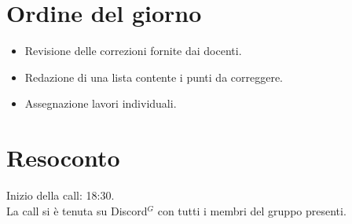 \section{Ordine del giorno}

\begin{itemize}
	\item Revisione delle correzioni fornite dai docenti.
	\item Redazione di una lista contente i punti da correggere.
	\item Assegnazione lavori individuali.
\end{itemize}

\section{Resoconto}
\label{sec:Resoconto}

\noindent 
Inizio della call: 18:30. \\
\noindent La call si è tenuta su Discord$^{G}$ con tutti i membri del gruppo presenti.

